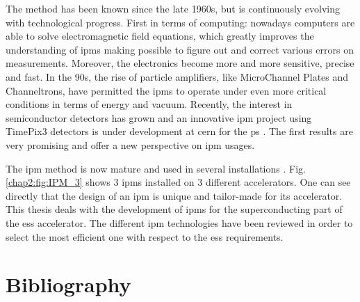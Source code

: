 \begin{refsection}
  The method has been known since the late 1960s, but is continuously evolving with technological progress. First in terms of computing: nowadays computers are able to solve electromagnetic field equations, which greatly improves the understanding of \acrshort{ipm}s making possible to figure out and correct various errors on measurements. Moreover, the electronics become more and more sensitive, precise and fast. In the 90s, the rise of particle amplifiers, like MicroChannel Plates and Channeltrons, have permitted the \acrshort{ipm}s to operate under even more critical conditions in terms of energy and vacuum.
  Recently, the interest in semiconductor detectors has grown and an innovative \acrshort{ipm} project using TimePix3 detectors is under development at \acrshort{cern} for the \acrshort{ps} \cite{Storey2015}. The first results are very promising \cite{Storey2017} and offer a new perspective on \acrshort{ipm} usages.

  The \acrshort{ipm} method is now mature and used in several installations \cite{Krider1989,Wittenburg1992,Satou2006,Giacomini2011,Morris2011,egberts2012}.
  Fig. \ref{chap2:fig:IPM_3} shows 3 \acrshort{ipm}s installed on 3 different accelerators. One can see directly that the design of an \acrshort{ipm} is unique and tailor-made for its accelerator. This thesis deals with the development of \acrshort{ipm}s for the superconducting part of the \acrshort{ess} accelerator. The different \acrshort{ipm} technologies have been reviewed in order to select the most efficient one with respect to the \acrshort{ess} requirements.

  

  \cleardoublepage
  \section*{Bibliography}
  \label{ch2:bib}
  \printbibliography[heading=subbibliography]

\end{refsection}
